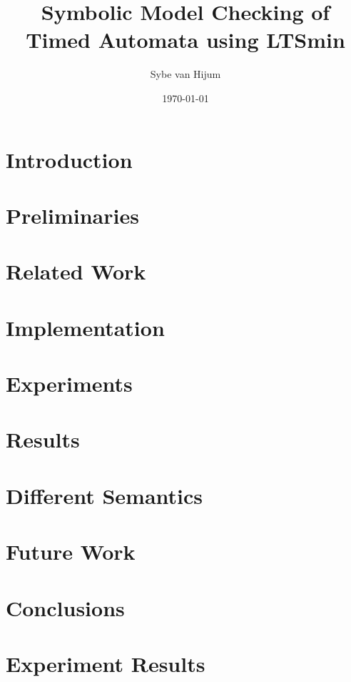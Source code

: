 \documentclass[11pt,a4paper]{article}
\newcommand{\ltsmin}{LTSmin}
\begin{document}
\newtheorem{mydef}{Definition}
\newtheorem{myconjecture}{Conjecture}
\title{Symbolic Model Checking of Timed Automata using \ltsmin{}}
\author{Sybe van Hijum}
\date{\today{}}
\maketitle

\clearpage
\tableofcontents

\clearpage
\section{Introduction}


%

\clearpage
\section{Preliminaries}


\clearpage
\section{Related Work}


\clearpage
\section{Implementation}


%

%

\clearpage
\section{Experiments}


\clearpage
\section{Results}


\clearpage
\section{Different Semantics}


\clearpage
\section{Future Work}


\clearpage
\section{Conclusions}


\clearpage
{}


\clearpage
\appendix
\section{Experiment Results}
\label{app:results}

\end{document}
